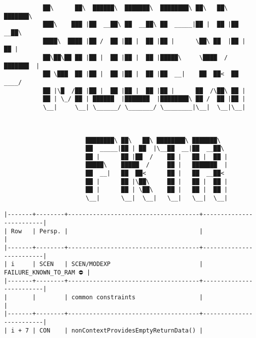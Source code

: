 \documentclass[varwidth=\maxdimen,margin=0.5cm,multi={verbatim}]{standalone}
\begin{document}
\begin{verbatim}
           ██\      ██\  ██████\  ███████\  ████████\ ██\   ██\ ███████\  
           ███\    ███ |██  __██\ ██  __██\ ██  _____|██ |  ██ |██  __██\ 
           ████\  ████ |██ /  ██ |██ |  ██ |██ |      \██\ ██  |██ |  ██ |
           ██\██\██ ██ |██ |  ██ |██ |  ██ |█████\     \████  / ███████  |
           ██ \███  ██ |██ |  ██ |██ |  ██ |██  __|    ██  ██<  ██  ____/ 
           ██ |\█  /██ |██ |  ██ |██ |  ██ |██ |      ██  /\██\ ██ |      
           ██ | \_/ ██ | ██████  |███████  |████████\ ██ /  ██ |██ |      
           \__|     \__| \______/ \_______/ \________|\__|  \__|\__|      
                                                                          
                                                                          
                                                                          
                       ████████\ ██\   ██\ ████████\ ███████\             
                       ██  _____|██ | ██  |\__██  __|██  __██\            
                       ██ |      ██ |██  /    ██ |   ██ |  ██ |           
                       █████\    █████  /     ██ |   ███████  |           
                       ██  __|   ██  ██<      ██ |   ██  __██<            
                       ██ |      ██ |\██\     ██ |   ██ |  ██ |           
                       ██ |      ██ | \██\    ██ |   ██ |  ██ |           
                       \__|      \__|  \__|   \__|   \__|  \__|

|-------+--------+-------------------------------------+-------------------------|
| Row   | Persp. |                                     |                         |
|-------+--------+-------------------------------------+-------------------------|
| i     | SCEN   | SCEN/MODEXP                         | FAILURE_KNOWN_TO_RAM ⛔ |
|-------+--------+-------------------------------------+-------------------------|
|       |        | common constraints                  |                         |
|-------+--------+-------------------------------------+-------------------------|
| i + 7 | CON    | nonContextProvidesEmptyReturnData() |
\end{verbatim}
\end{document}
